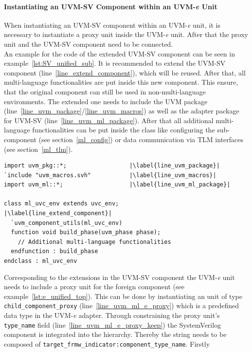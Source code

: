 \paragraph{Instantiating an UVM-SV Component within an UVM-\textit{e} Unit}
\label{sv_inside_e}
When instantiating an UVM-SV component within an UVM-\textit{e} unit,
it is necessary to instantiate a proxy unit inside the UVM-\textit{e} unit. After that the
proxy unit and the UVM-SV component need to be connected. \\
An example for the code of the extended UVM-SV component can be seen in
example~\ref{lst:SV_unified_sub}.
It is recommended to extend the UVM-SV component
(line~\ref{line_extend_component}), which will
be reused. After that, all multi-language functionalities are put inside this new
component. This ensure, that the original component can still be used in
non-multi-language environments. The extended one needs to include the UVM
package (line~\ref{line_uvm_package}/\ref{line_uvm_macros}) as well as the adapter
package for UVM-SV (line~\ref{line_uvm_ml_package}).
After that all additional multi-language functionalities can be put inside the
class like configuring the sub-component (see section~\ref{ml_config}) or data
communication via TLM interfaces (see section~\ref{ml_tlm}).
\medskip
{}
\begin{lstlisting}[frame=htrbl, caption={SystemVerilog: extended multi-language component}, label={lst:SV_unified_sub}]
import uvm_pkg::*;					|\label{line_uvm_package}|
`include "uvm_macros.svh"			|\label{line_uvm_macros}|
import uvm_ml::*;					|\label{line_uvm_ml_package}|

class ml_uvc_env extends uvc_env;			|\label{line_extend_component}|
  `uvm_component_utils(ml_uvc_env)
  function void build_phase(uvm_phase phase);
    // Additional multi-language functionalities
  endfunction : build_phase
endclass : ml_uvc_env
\end{lstlisting}
\medskip
Corresponding to the extensions in the UVM-SV component the UVM-\textit{e}
unit needs to include a proxy unit for the foreign component (see example~\ref{lst:e_unified_top}).
This can be done by instantiating an unit of type
\lstinline$child_component_proxy$ (line~\ref{line_uvm_ml_e_proxy}) which is a
predefined data type in the UVM-\textit{e} adapter.
Through constraining the proxy unit's \lstinline$type_name$ field
(line~\ref{line_uvm_ml_e_proxy_keep}) the
SystemVerilog component is integrated into the hierarchy. Thereby the string
needs to be composed of \lstinline$target_frmw_indicator:component_type_name$. Firstly
